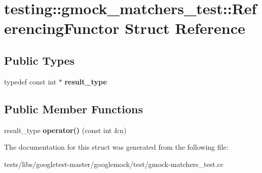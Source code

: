 \hypertarget{structtesting_1_1gmock__matchers__test_1_1ReferencingFunctor}{}\section{testing\+:\+:gmock\+\_\+matchers\+\_\+test\+:\+:Referencing\+Functor Struct Reference}
\label{structtesting_1_1gmock__matchers__test_1_1ReferencingFunctor}
\subsection*{Public Types}
\begin{DoxyCompactItemize}
\item 
\mbox{\label{structtesting_1_1gmock__matchers__test_1_1ReferencingFunctor_a5856a8175e2f797a6733a363b2834094}} 
typedef const int $\ast$ {\bfseries result\+\_\+type}
\end{DoxyCompactItemize}
\subsection*{Public Member Functions}
\begin{DoxyCompactItemize}
\item 
\mbox{\label{structtesting_1_1gmock__matchers__test_1_1ReferencingFunctor_a149f15ed9afbff28f5c3639c0f3eb255}} 
result\+\_\+type {\bfseries operator()} (const int \&n)
\end{DoxyCompactItemize}


The documentation for this struct was generated from the following file\+:\begin{DoxyCompactItemize}
\item 
tests/libs/googletest-\/master/googlemock/test/gmock-\/matchers\+\_\+test.\+cc\end{DoxyCompactItemize}
